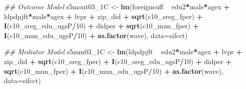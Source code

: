 \documentclass[
]{article}
\newenvironment{Shaded}{\begin{snugshade}}{\end{snugshade}}
\newcommand{\CommentTok}[1]{\textcolor[rgb]{0.56,0.35,0.01}{\textit{#1}}}
\newcommand{\DataTypeTok}[1]{\textcolor[rgb]{0.13,0.29,0.53}{#1}}
\newcommand{\DecValTok}[1]{\textcolor[rgb]{0.00,0.00,0.81}{#1}}
\newcommand{\KeywordTok}[1]{\textcolor[rgb]{0.13,0.29,0.53}{\textbf{#1}}}
\newcommand{\NormalTok}[1]{#1}
\newcommand{\OperatorTok}[1]{\textcolor[rgb]{0.81,0.36,0.00}{\textbf{#1}}}
\newcommand{\StringTok}[1]{\textcolor[rgb]{0.31,0.60,0.02}{#1}}
\begin{document}
\begin{Shaded}
\begin{Highlighting}[]
\CommentTok{## Outcome Model }
\NormalTok{s5mout03_1C <-}\StringTok{ }\KeywordTok{lm}\NormalTok{(foreignsuff  }\OperatorTok{~}\StringTok{ }\NormalTok{edu2}\OperatorTok{*}\NormalTok{male}\OperatorTok{*}\NormalTok{agex }\OperatorTok{+}\StringTok{ }\NormalTok{ldpdpjft}\OperatorTok{*}\NormalTok{male}\OperatorTok{*}\NormalTok{agex }\OperatorTok{+}\StringTok{ }\NormalTok{lvpr }\OperatorTok{+}\StringTok{  }
\StringTok{                    }\NormalTok{zip_did }\OperatorTok{+}\StringTok{ }\KeywordTok{sqrt}\NormalTok{(c10_sreg_fper) }\OperatorTok{+}\StringTok{ }\KeywordTok{I}\NormalTok{(c10_sreg_edu_ugsP}\OperatorTok{/}\DecValTok{10}\NormalTok{) }\OperatorTok{+}\StringTok{ }
\StringTok{                    }\NormalTok{didper }\OperatorTok{+}\StringTok{ }\KeywordTok{sqrt}\NormalTok{(c10_mun_fper) }\OperatorTok{+}\StringTok{ }\KeywordTok{I}\NormalTok{(c10_mun_edu_ugsP}\OperatorTok{/}\DecValTok{10}\NormalTok{) }\OperatorTok{+}\StringTok{ }
\StringTok{                    }\KeywordTok{as.factor}\NormalTok{(wave), }\DataTypeTok{data=}\NormalTok{sifcct)}

\CommentTok{## Mediator Model}
\NormalTok{s5mm03_1C <-}\StringTok{ }\KeywordTok{lm}\NormalTok{(ldpdpjft }\OperatorTok{~}\StringTok{ }\NormalTok{edu2}\OperatorTok{*}\NormalTok{male}\OperatorTok{*}\NormalTok{agex }\OperatorTok{+}\StringTok{ }\NormalTok{lvpr }\OperatorTok{+}\StringTok{  }
\StringTok{                  }\NormalTok{zip_did }\OperatorTok{+}\StringTok{ }\KeywordTok{sqrt}\NormalTok{(c10_sreg_fper) }\OperatorTok{+}\StringTok{ }\KeywordTok{I}\NormalTok{(c10_sreg_edu_ugsP}\OperatorTok{/}\DecValTok{10}\NormalTok{) }\OperatorTok{+}\StringTok{ }
\StringTok{                  }\NormalTok{didper }\OperatorTok{+}\StringTok{ }\KeywordTok{sqrt}\NormalTok{(c10_mun_fper) }\OperatorTok{+}\StringTok{ }\KeywordTok{I}\NormalTok{(c10_mun_edu_ugsP}\OperatorTok{/}\DecValTok{10}\NormalTok{) }\OperatorTok{+}\StringTok{ }
\StringTok{                  }\KeywordTok{as.factor}\NormalTok{(wave), }\DataTypeTok{data=}\NormalTok{sifcct)}


\end{Highlighting}
\end{Shaded}
\end{document}

